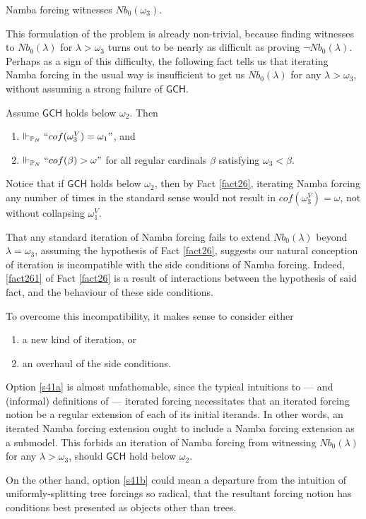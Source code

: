 \documentclass[12pt]{article}
\numberwithin{equation}{section}
\begin{document}
\begin{fact}
Namba forcing witnesses $Nb_0(\omega_3)$.
\end{fact}

This formulation of the problem is already non-trivial, because finding witnesses to $Nb_0(\lambda)$ for $\lambda > \omega_3$ turns out to be nearly as difficult as proving $\neg Nb_0(\lambda)$. Perhaps as a sign of this difficulty, the following fact tells us that iterating Namba forcing in the usual way is insufficient to get us $Nb_0(\lambda)$ for any $\lambda > \omega_3$, without assuming a strong failure of $\mathsf{GCH}$. 

\begin{fact}\label{fact26}
Assume $\mathsf{GCH}$ holds below $\omega_2$. Then 
\begin{enumerate}[label=(\arabic*)]
    \item\label{fact261} $\Vdash_{\mathbb{P}_{N}} ``cof(\omega_3^V) = \omega_1"$, and
    \item $\Vdash_{\mathbb{P}_{N}} ``cof(\beta) > \omega"$ for all regular cardinals $\beta$ satisfying $\omega_3 < \beta$.
\end{enumerate}
\end{fact}

Notice that if $\mathsf{GCH}$ holds below $\omega_2$, then by Fact \ref{fact26}, iterating Namba forcing any number of times in the standard sense would not result in $cof(\omega_3^V) = \omega$, not without collapsing $\omega_1^V$.

\begin{rem}\label{rem47}
That any standard iteration of Namba forcing fails to extend $Nb_0(\lambda)$ beyond $\lambda = \omega_3$, assuming the hypothesis of Fact \ref{fact26}, suggests our natural conception of iteration is incompatible with the side conditions of Namba forcing. Indeed, \ref{fact261} of Fact \ref{fact26} is a result of interactions between the hypothesis of said fact, and the behaviour of these side conditions. 

To overcome this incompatibility, it makes sense to consider either
\begin{enumerate}[label=(\alph*)]
    \item\label{s41a} a new kind of iteration, or 
    \item\label{s41b} an overhaul of the side conditions.
\end{enumerate} 

Option \ref{s41a} is almost unfathomable, since the typical intuitions to --- and (informal) definitions of --- iterated forcing necessitates that an iterated forcing notion be a regular extension of each of its initial iterands. In other words, an iterated Namba forcing extension ought to include a Namba forcing extension as a submodel. This forbids an iteration of Namba forcing from witnessing $Nb_0(\lambda)$ for any $\lambda > \omega_3$, should $\mathsf{GCH}$ hold below $\omega_2$. 

On the other hand, option \ref{s41b} could mean a departure from the intuition of uniformly-splitting tree forcings so radical, that the resultant forcing notion has conditions best presented as objects other than trees.
\end{rem}
\end{document}
